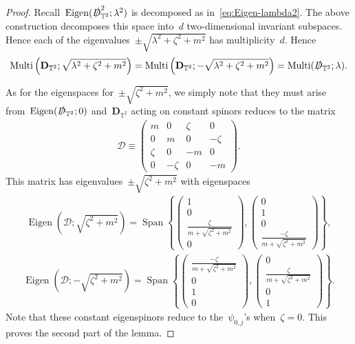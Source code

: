 \documentclass[10pt,a4paper]{amsart}
\newcommand{\T}{\mathbb{T}}
\newcommand{\D}{\slashed{D}}
\newcommand{\pD}{\mathbf{D}}
\newcommand{\parenthesis}[1]{\left(#1\right)} %
\newcommand{\braces}[1]{\left\{#1\right\}} %
\DeclareMathOperator{\Eigen}{Eigen}
\DeclareMathOperator{\Mtp}{Multi} %
\DeclareMathOperator{\Span}{Span}
\begin{document}
\begin{proof}
    Recall~$\Eigen(\D_{\T^2}^2;\lambda^2)$ is decomposed as in~\eqref{eq:Eigen-lambda2}.
    The above construction decomposes this space into~$d$ two-dimensional invariant subspaces. Hence each of the eigenvalues~$\pm\sqrt{\lambda^2+\zeta^2+m^2}$ has multiplicity~$d$.  
    Hence
    \begin{align}
        \Mtp\parenthesis{
            \pD_{\T^2};
            \sqrt{\lambda^2+\zeta^2+m^2}}
        =\Mtp\parenthesis{
            \pD_{\T^2};
            -\sqrt{\lambda^2+\zeta^2+m^2}}
        =\Mtp(\D_{\T^2};\lambda).
    \end{align}

    As for the eigenspaces for~$\pm\sqrt{\zeta^2+m^2}$, we simply note that they must arise from~$\Eigen(\D_{\T^2};0)$ and~$\pD_{\T^2}$ acting on constant spinors reduces to the matrix
    \begin{align}
        \mathscr{D}\equiv
        \begin{pmatrix}
            m & 0 & \zeta & 0 \\
            0 & m & 0& -\zeta \\
            \zeta & 0 & -m & 0 \\
            0 & -\zeta & 0 & -m
        \end{pmatrix}. 
    \end{align}
    This matrix has eigenvalues~$\pm\sqrt{\zeta^2+m^2}$ with eigenspaces 
    \begin{align}
        \Eigen(\mathscr{D};\sqrt{\zeta^2+m^2})
        =\Span\braces{ \begin{pmatrix} 1 \\ 0 \\ \frac{\zeta}{ m+\sqrt{\zeta^2+m^2} } \\ 0  \end{pmatrix}, 
        \begin{pmatrix} 0 \\ 1 \\ 0 \\ \frac{-\zeta}{m+\sqrt{\zeta^2+m^2}} \end{pmatrix} }, 
    \end{align}
    \begin{align}
        \Eigen(\mathscr{D};-\sqrt{\zeta^2+m^2})
        =\Span\braces{ \begin{pmatrix} \frac{-\zeta}{m+\sqrt{\zeta^2+m^2}} \\ 0 \\ 1 \\ 0  \end{pmatrix}, 
        \begin{pmatrix} 0 \\ \frac{\zeta}{m+\sqrt{\zeta^2+m^2}} \\ 0 \\ 1 \end{pmatrix}}. 
    \end{align}
    Note that these constant eigenspinors reduce to the~$\psi_{0,j}$'s when~$\zeta=0$. 
    This proves the second part of the lemma. 
\end{proof}
\end{document}
